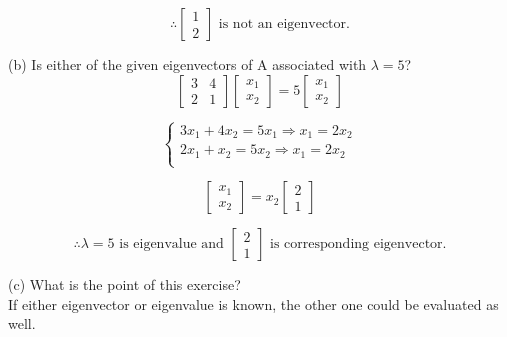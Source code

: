 \documentclass{article} %
\begin{document}
{    \[
        \therefore \begin{bmatrix} 1 \\ 2 \end{bmatrix} \text{ is not an eigenvector.}
    \]

    \noindent (b) Is either of the given eigenvectors of A associated with $ \lambda = 5 $? \\

    \[
        \begin{bmatrix}
        3 & 4 \\
        2 & 1 
        \end{bmatrix}
        \begin{bmatrix}
        x_1 \\
        x_2 
        \end{bmatrix}
        =
        5
        \begin{bmatrix}
        x_1 \\
        x_2 
        \end{bmatrix}
    \]

    \[
        \begin{cases}
        3x_1 + 4x_2 = 5x_1 \Rightarrow x_1 = 2x_2 \\
        2x_1 + x_2 = 5x_2 \Rightarrow x_1 = 2x_2 \\
        \end{cases}
    \]

    \[
        \begin{bmatrix}
        x_1 \\
        x_2 
        \end{bmatrix}
        =
        x_2
        \begin{bmatrix}
        2 \\
        1 
        \end{bmatrix}
    \]

    \[
        \therefore \lambda = 5 \text{ is eigenvalue and } 
        \begin{bmatrix}
            2 \\
            1
        \end{bmatrix} \text{ is corresponding eigenvector.}
    \]

    \noindent (c) What is the point of this exercise? \\
    If either eigenvector or eigenvalue is known, the other one could be evaluated as well.\\

}
\end{document}
